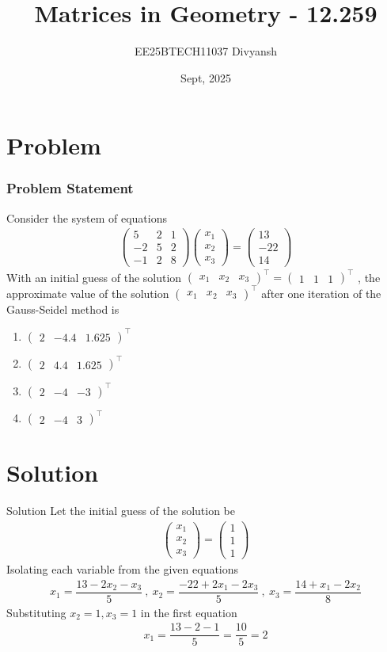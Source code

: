 \documentclass{beamer}
\title{Matrices in Geometry - 12.259}
\author{EE25BTECH11037  Divyansh}
\date{Sept, 2025}
\theoremstyle{remark}
\newcommand{\myvec}[1]{\ensuremath{\begin{pmatrix}#1\end{pmatrix}}}
\begin{document}
\maketitle


\section{Problem}
\begin{frame}
\frametitle{Problem Statement}
Consider the system of equations
\begin{align*}
    \myvec{5 & 2 & 1 \\ -2 & 5 & 2 \\ -1 & 2 & 8}\myvec{x_1 \\ x_2\\ x_3}=\myvec{13 \\ -22 \\ 14}
\end{align*}
With an initial guess of the solution $\myvec{x_1 & x_2& x_3}^{\top} = \myvec{1 & 1& 1}^{\top}$ , the approximate value of the solution $\myvec{x_1 & x_2& x_3}^{\top}$ after one iteration of the Gauss-Seidel method is
\begin{enumerate}[label=(\alph*)]
    \item $\myvec{2 & -4.4& 1.625}^{\top}$
    \item $\myvec{2 & 4.4& 1.625}^{\top}$
    \item $\myvec{2 & -4& -3}^{\top}$
    \item $\myvec{2 & -4& 3}^{\top}$
\end{enumerate}
\end{frame}

\section{Solution}
\begin{frame}{Solution}
Let the initial guess of the solution be 
\begin{align}
    \myvec{x_1 \\ x_2\\ x_3}=\myvec{1 \\1 \\1}
\end{align}
Isolating each variable from the given equations 
\begin{align}
    x_1=\dfrac{13-2x_2-x_3}{5} \ , \ 
    x_2=\dfrac{-22+2x_1-2x_3}{5} \ , \ 
    x_3=\dfrac{14+x_1-2x_2}{8}
\end{align}
Substituting $x_2=1, x_3=1$ in the first equation
\begin{align}
    x_1=\dfrac{13-2-1}{5} = \dfrac{10}{5} =2
\end{align}
\end{frame}
\end{document}
